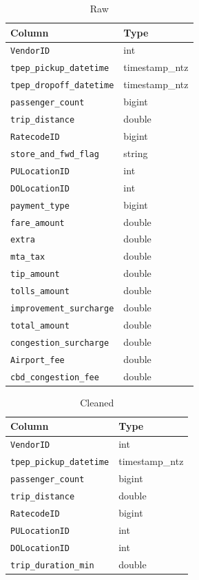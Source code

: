 \documentclass[11pt]{article}
\newcommand{\col}[1]{\texttt{#1}}
\begin{document}
\begin{table}[H]
\centering
\caption{Raw}
\begin{tabular}{ll}
\toprule
Column & Type \\
\midrule
\col{VendorID}              & int \\
\col{tpep\_pickup\_datetime}  & timestamp\_ntz \\
\col{tpep\_dropoff\_datetime} & timestamp\_ntz \\
\col{passenger\_count}       & bigint \\
\col{trip\_distance}         & double \\
\col{RatecodeID}            & bigint \\
\col{store\_and\_fwd\_flag}    & string \\
\col{PULocationID}          & int \\
\col{DOLocationID}          & int \\
\col{payment\_type}          & bigint \\
\col{fare\_amount}           & double \\
\col{extra}                 & double \\
\col{mta\_tax}               & double \\
\col{tip\_amount}            & double \\
\col{tolls\_amount}          & double \\
\col{improvement\_surcharge} & double \\
\col{total\_amount}          & double \\
\col{congestion\_surcharge}  & double \\
\col{Airport\_fee}           & double \\
\col{cbd\_congestion\_fee}    & double \\
\bottomrule
\end{tabular}
\end{table}

\begin{table}[H]
\centering
\caption{Cleaned}
\begin{tabular}{ll}
\toprule
Column & Type \\
\midrule
\col{VendorID}             & int \\
\col{tpep\_pickup\_datetime} & timestamp\_ntz \\
\col{passenger\_count}      & bigint \\
\col{trip\_distance}        & double \\
\col{RatecodeID}           & bigint \\
\col{PULocationID}         & int \\
\col{DOLocationID}         & int \\
\col{trip\_duration\_min}    & double \\
\bottomrule
\end{tabular}
\end{table}
\end{document}
